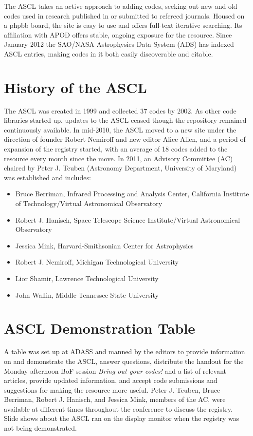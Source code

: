 The ASCL takes an active approach to adding codes, seeking out new and old codes used in research published in or submitted to refereed journals. Housed on a phpbb board, the site is easy to use and offers full-text iterative searching. Its affiliation with APOD offers stable, ongoing exposure for the resource. Since January 2012 the SAO/NASA Astrophysics Data System (ADS) has indexed ASCL entries, making codes in it both easily discoverable and citable.

\section{History of the ASCL}

The ASCL was created in 1999 and collected 37 codes by 2002. As other code libraries started up, updates to the ASCL ceased though the repository remained continuously available. In mid-2010, the ASCL moved to a new site under the direction of founder Robert Nemiroff and new editor Alice Allen, and a period of expansion of the registry started, with an average of 18 codes added to the resource every month since the move. In 2011, an Advisory Committee (AC) chaired by Peter J. Teuben (Astronomy Department, University of Maryland) was established and includes: 
\begin{itemize}
\item Bruce Berriman, Infrared Processing and Analysis Center, California Institute of Technology/Virtual Astronomical Observatory
\item Robert J. Hanisch, Space Telescope Science Institute/Virtual Astronomical Observatory
\item Jessica Mink, Harvard-Smithsonian Center for Astrophysics
\item Robert J. Nemiroff, Michigan Technological University
\item Lior Shamir, Lawrence Technological University
\item John Wallin, Middle Tennessee State University
\end{itemize}

\section{ASCL Demonstration Table}

A table was set up at ADASS and manned by the editors to provide information on and demonstrate the ASCL, answer questions, distribute the handout for the Monday afternoon BoF session {\em Bring out your codes!} \citep{allen12XXII} and a list of relevant articles, provide updated information, and accept code submissions and suggestions for making the resource more useful. Peter J. Teuben,  Bruce Berriman, Robert J. Hanisch, and Jessica Mink, members of the AC, were available at different times throughout the conference to discuss the registry. Slide shows about the ASCL ran on the display monitor when the registry was not being demonstrated.

